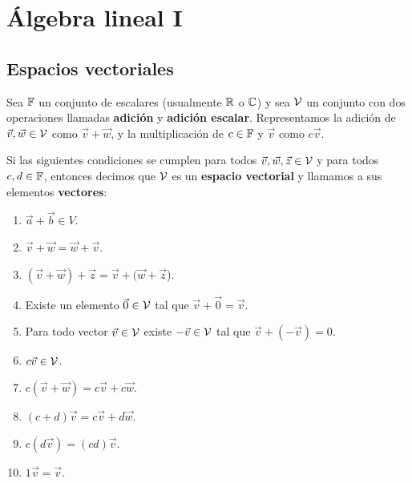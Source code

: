 \chapter{Álgebra lineal I} %
\label{cha:algebra_lineal_i}

\section{Espacios vectoriales} %
\label{sec:espacios_vectoriales}

\begin{definition}
	\label{def:espacio_vectorial}
	Sea \(\mathbb{F}\) un conjunto de escalares (usualmente \(\mathbb{R}\) o \(\mathbb{C}\)) y sea 
	\(\mathcal{V}\) un conjunto con dos operaciones llamadas \textbf{adición} y 
	\textbf{adición	escalar}. Representamos la adición de \(\vec{v}, 
	\vec{w} \in \mathcal{V}\) como \(\vec{v} + \vec{w}\), y la multiplicación de \(c
	\in \mathbb{F}\) y \(\vec{v}\) como \(c\vec{v}\).

	Si las siguientes condiciones se cumplen para todos \(\vec{v}, \vec{w}, 
	\vec{z} \in \mathcal{V}\) y para todos \(c,d \in \mathbb{F}\), entonces decimos que \(\mathcal{V}\) 
	es un \textbf{espacio vectorial} y llamamos a sus elementos 
	\textbf{vectores}:

	\begin{enumerate}
		\item \(\vec{a} + \vec{b} \in V\).

		\item \(\vec{v} + \vec{w} = \vec{w} + \vec{v}\).

		\item \((\vec{v} + \vec{w} ) +  \vec{z} = \vec{v} + (\vec{w} + 
		\vec{z}\)).

		\item Existe un elemento \(\vec{0} \in \mathcal{V}\) tal que \(\vec{v} + 
		\vec{0} = \vec{v}\).

		\item Para todo vector \(\vec{v} \in \mathcal{V}\) existe \(-\vec{v} \in \mathcal{V}\)
		tal que \(\vec{v} + (-\vec{v}) = 0\).

		\item \(c \vec{v} \in \mathcal{V}\).

		\item \(c(\vec{v} + \vec{w}) = c \vec{v} + c \vec{w} \).

		\item \((c+d) \vec{v} = c \vec{v} + d \vec{w}\).

		\item \(c(d \vec{v}) = (cd) \vec{v}\).

		\item \(1 \vec{v} = \vec{v}\).
	\end{enumerate}
	
\end{definition}

